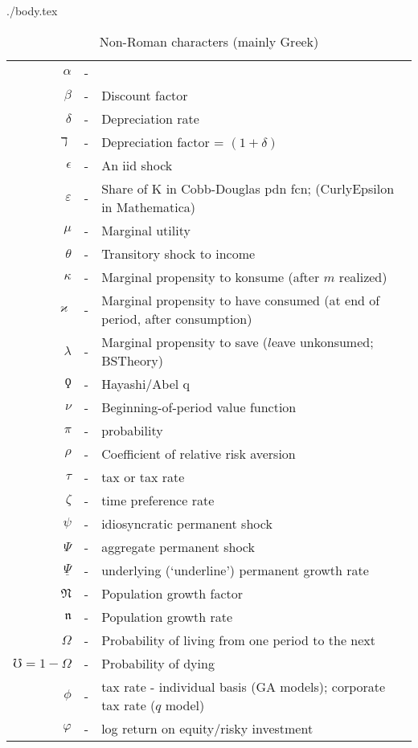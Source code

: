 \documentclass{econtex}
\begin{document}
\begin{verbatimwrite}{./body.tex}

\begin{table}
\caption{Non-Roman characters (mainly Greek)}
\begin{tabular}{rcl}
    $\alpha$   & - & 
\\  $\beta$   & - & Discount factor
\\  $\delta$  & - & Depreciation rate
\\  $\daleth$ & - & Depreciation factor = $(1+\delta)$
\\  $\epsilon$ & - & An iid shock
\\  $\varepsilon$ & - & Share of K in Cobb-Douglas pdn fcn; (CurlyEpsilon in Mathematica)
\\  $\mu$     & - & Marginal utility
\\  $\theta$  & - & Transitory shock to income
\\  $\kappa$  & - & Marginal propensity to konsume (after $m$ realized)
\\  $\varkappa$  & - & Marginal propensity to have consumed (at end of period, after consumption)
\\  $\lambda$ & - & Marginal propensity to save ($l$eave unkonsumed; BSTheory)
\\  $\koppa$   & - & Hayashi/Abel q
\\  $\nu$     & - & Beginning-of-period value function
\\  $\pi$     & - & probability
\\  $\rho$    & - & Coefficient of relative risk aversion
\\  $\tau$    & - & tax or tax rate
\\  $\zeta$    & - & time preference rate
\\  $\psi$    & - & idiosyncratic permanent shock
\\  $\Psi$    & - & aggregate permanent shock
\\  $\underline{\Psi}$ & - & underlying (`underline') permanent growth rate
\\  $\mathfrak{N}$ & - & Population growth factor
\\  $\mathfrak{n}$ & - & Population growth rate
\\  $\Omega$   & - & Probability of living from one period to the next
\\  $\mho=1-\Omega$  & - & Probability of dying 
\\  $\phi$    & - & tax rate - individual basis (GA models); corporate tax rate ($q$ model)
\\  $\varphi$ & - & log return on equity/risky investment

\end{tabular}
\end{table}
\end{verbatimwrite}
\end{document}

